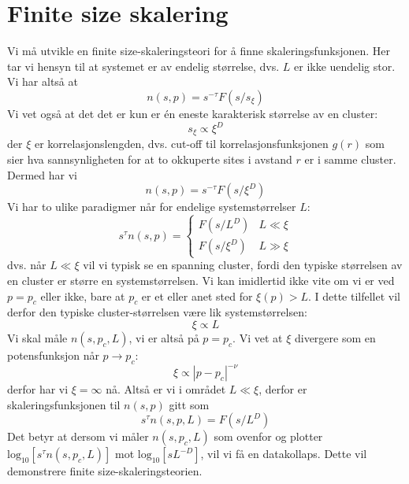 \documentclass[english, a4paper]{article}
\begin{document}
\section{Finite size skalering}
Vi må utvikle en finite size-skaleringsteori for å finne skaleringsfunksjonen. 
Her tar vi hensyn til at systemet er av endelig størrelse, dvs. $L$ er ikke uendelig stor. 
Vi har altså at 
\begin{equation}
 n(s,p) = s^{-\tau}F(s/s_\xi)
\end{equation}
Vi vet også at det det er kun er én eneste karakterisk størrelse av en cluster:
\begin{equation}
 s_\xi \propto \xi^D
\end{equation}
der $\xi$ er korrelasjonslengden, dvs. cut-off til korrelasjonsfunksjonen $g(r)$ som sier
hva sannsynligheten for at to okkuperte sites i avstand $r$ er i samme cluster. 
Dermed har vi
\begin{equation}
 n(s,p) = s^{-\tau}F(s/\xi^D)
\end{equation}
Vi har to ulike paradigmer når for endelige systemstørrelser $L$:
\begin{equation}
 s^\tau n(s,p) = 
 \begin{cases}
 F(s/L^D) & L \ll \xi \\
 F(s/\xi^D) & L \gg \xi
 \end{cases}
\end{equation}
dvs. når $L \ll \xi$ vil vi typisk se en spanning cluster, fordi den typiske størrelsen av en cluster
er større en systemstørrelsen. Vi kan imidlertid ikke vite om vi er ved $p=p_c$ eller ikke, bare
at $p_c$ er et eller anet sted for $\xi(p) > L$. I dette tilfellet vil derfor den typiske cluster-størrelsen
være lik systemstørrelsen:
\begin{equation}
 \xi \propto L
\end{equation}
Vi skal måle $n(s, p_c, L)$, vi er altså på $p=p_c$. Vi vet at $\xi$ divergere som en potensfunksjon
når $p \to p_c$:
\begin{equation}
 \xi \propto |p-p_c|^{-\nu}
\end{equation}
derfor har vi $\xi = \infty$ nå. Altså er vi i området $L \ll \xi$, derfor er skaleringsfunksjonen til 
$n(s,p)$ gitt som
\begin{equation}
 s^{\tau} n(s,p, L) = F(s/L^D)
\end{equation}
Det betyr at dersom vi måler $n(s,p_c,L)$ som ovenfor og plotter $\textrm{log}_{10}[s^\tau n(s,p_c,L)]$ mot
$\textrm{log}_{10}[sL^{-D}]$, vil vi få en datakollaps. Dette vil demonstrere finite size-skaleringsteorien.
\end{document}
